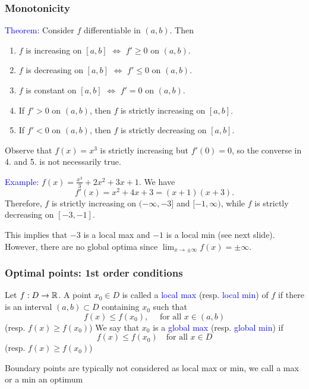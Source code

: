 \documentclass[11pt,aspectratio=169]{beamer}
\begin{document}
\begin{frame}
\frametitle{Monotonicity}
\textcolor{blue}{Theorem:} Consider $f$ differentiable in $(a,b)$. Then 
\begin{enumerate}
\item $f$ is increasing on $[a,b]$
$\Longleftrightarrow$  $f'\geq 0$ on $(a,b)$.
\item $f$ is decreasing on $[a,b]$ 
$\Longleftrightarrow$ $f'\leq 0$ on $(a,b)$. 
\item $f$ is constant on $[a,b]$ $\Longleftrightarrow$ $f'=0$ on $(a,b)$.
\item If $f'>0$ on $(a,b)$, then $f$ is strictly increasing on $[a,b]$.
\item If $f'<0$ on $(a,b)$, then $f$ is strictly decreasing on $[a,b]$.
\end{enumerate}
\begin{tiny}Observe that $f(x)=x^3$ is strictly increasing but $f'(0)=0$, so the converse in 4. and 5. is not necessarily true.\end{tiny}
\vskip 12pt
\textcolor{blue}{Example:} $f(x)=\frac{x^3}{3}+2x^2+3x+1.$ We have
$$
f'(x)=x^2+4x+3=(x+1)(x+3).
$$
Therefore, $f$ is strictly increasing on $(-\infty, -3]$ and $[-1, \infty)$, while $f$ is strictly decreasing on $[-3,-1]$.

\begin{tiny}This implies that $-3$ is a local max and $-1$ is a local min (see next slide). 
However, there are no global optima since $\lim_{ x \rightarrow \pm \infty} f(x)=\pm \infty$.  \end{tiny}


\end{frame}








\begin{frame}
\frametitle{Optimal points: 1st order conditions}
Let $f:D \rightarrow \mathbb R$. A point $x_0 \in D$ is called a \textcolor{blue}{local max} (resp. \textcolor{blue}{local min}) of $f$ if there is an interval $(a,b) \subset D$ containing $x_0$ such that $$f(x)\leq f(x_0), \quad \text{ for all } x \in (a,b)$$ (resp. $f(x) \geq f(x_0)$)
\vskip 12pt
We say that $x_0$ is a \textcolor{blue}{global max} (resp. \textcolor{blue}{global min}) if $$f(x)\leq f(x_0)\quad \text{for all } x \in D$$ (resp. $f(x) \geq f(x_0)$) 

\begin{tiny} Boundary points are typically not considered as local max or min, we call a max or a min an optimum  \end{tiny}

 




\end{frame}
\end{document}
